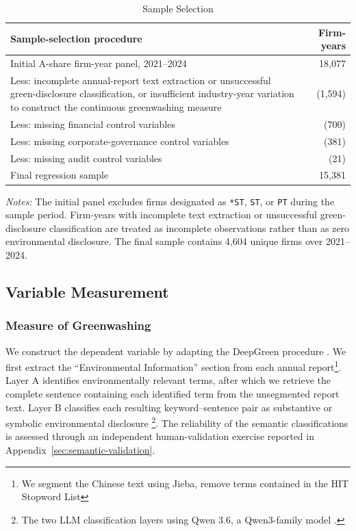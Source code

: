 \documentclass[11pt]{article}
\begin{document}
\begin{table}[htbp]
    \centering
    \caption{Sample Selection}
    \label{tab:sample_selection}
    \begin{tabular}{p{}r}
        \toprule
        Sample-selection procedure & Firm-years \\
        \midrule
        Initial A-share firm-year panel, 2021--2024 & 18,077 \\
        Less: incomplete annual-report text extraction or unsuccessful green-disclosure classification, or insufficient industry-year variation to construct the continuous greenwashing measure & (1,594) \\
        Less: missing financial control variables & (700) \\
        Less: missing corporate-governance control variables & (381) \\
        Less: missing audit control variables & (21) \\
        \midrule
        Final regression sample & 15,381 \\
        \bottomrule
    \end{tabular}

    \par\smallskip
    \begin{minipage}{0.95\textwidth}
        \footnotesize
        \textit{Notes:} The initial panel excludes firms designated as \texttt{*ST}, \texttt{ST}, or \texttt{PT} during the sample period. Firm-years with incomplete text extraction or unsuccessful green-disclosure classification are treated as incomplete observations rather than as zero environmental disclosure. The final sample contains 4,604 unique firms over 2021--2024.
    \end{minipage}
    \end{table}

\subsection{Variable Measurement}

\subsubsection{Measure of Greenwashing}

We construct the dependent variable by adapting the DeepGreen procedure \citep{xu2026deepgreen}. 
We first extract the ``Environmental Information'' section from each annual report\footnote{We segment the Chinese text using Jieba, remove terms contained in the HIT Stopword List}. 
Layer A identifies environmentally relevant terms, after which we retrieve the complete sentence containing each identified term from the unsegmented report text. 
Layer B classifies each resulting keyword--sentence pair as substantive or symbolic environmental disclosure \footnote{The two LLM classification layers using Qwen 3.6, a Qwen3-family model \citep{yang2025qwen3}.}. 
The reliability of the semantic classifications is assessed through an independent human-validation exercise reported in Appendix~\ref{sec:semantic-validation}.
\end{document}
